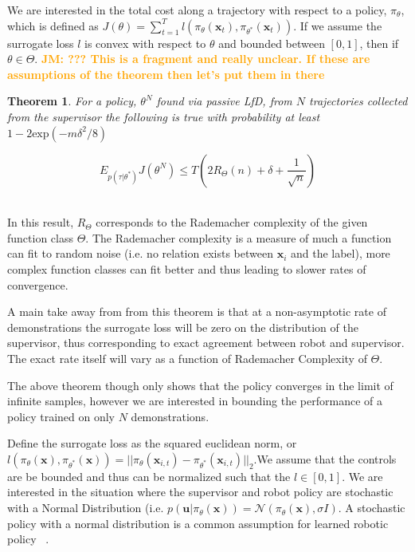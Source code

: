 \documentclass[10pt, conference]{ieeeconf}      %
\newtheorem{theorem}{Theorem}[section]
\newcommand{\bu}{\mathbf{u}}
\newcommand{\bx}{\mathbf{x}}
\newcommand{\jmnote}[1]{%
 {\textcolor{orange}{\textbf{JM: #1}}}{}}
\begin{document}
We are interested in the total cost along a trajectory with respect to a policy, $\pi_{\theta}$, which is defined as $J(\theta) = \sum^T_{t=1} l(\pi_{\theta}(\bx_{t}),\pi_{\theta^*}(\bx_{t}))$.  If we assume the surrogate loss $l$ is convex with respect to $\theta$ and bounded between $[0,1]$, then if $\theta \in \Theta$. \jmnote{??? This is a fragment and really unclear. If these are assumptions of the theorem then let's put them in there}
\\

\begin{theorem}\label{thm:sup}
For a policy, $\theta^N$ found via passive LfD, from $N$ trajectories collected from the supervisor the following is true with probability at least $1- 2\mbox{exp} (-m\delta^2/8)$

$$E_{p(\tau|\theta^*)} J(\theta^N)\leq T( 2R_{\Theta}(n) + \delta+ \frac{1}{\sqrt{n}})$$\\

\end{theorem}

In this result, $R_{\Theta}$ corresponds to the Rademacher complexity of the given function class $\Theta$. The Rademacher complexity is a measure of much a function can fit to random noise (i.e. no relation exists between $\bx_i$ and the label), more complex function classes can fit better and thus leading to slower rates of convergence.

A main take away from from this theorem  is that at a non-asymptotic rate of demonstrations the surrogate loss will be zero on the distribution of the supervisor, thus corresponding to exact agreement between robot and supervisor. The exact rate itself will vary as a function of Rademacher Complexity of $\Theta$. 

The above theorem though only shows that the policy converges in the limit of infinite samples, however we are interested in bounding the performance of a policy trained on only $N$ demonstrations. 

 Define the surrogate loss as the squared euclidean norm, or $l(\pi_{\theta}(\bx),\pi_{\theta^*}(\bx)) = ||\pi_{\theta}(\bx_{i,t}) - \pi_{\theta^*}(\bx_{i,t})||_2$.We assume that the controls are be bounded and thus can be normalized such that the $l \in [0,1]$.  We are interested in the situation where the supervisor and robot policy are stochastic with a Normal Distribution (i.e. $p(\bu|\pi_{\theta}(\bx)) = \mathcal{N}(\pi_\theta(\bx),\sigma I)$. A stochastic policy with a normal distribution is a common assumption for learned robotic policy ~\cite{levine2015end}. 
 
\end{document}
